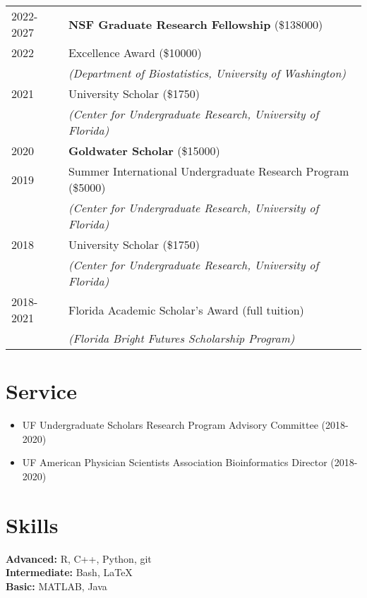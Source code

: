 \documentclass[margin,centered]{res}
\begin{document}
\begin{resume}
\begin{tabular}{@{}p{0.8in}p{4in}}
2022-2027 & \textbf{NSF Graduate Research Fellowship} (\$138000)\\
2022 & Excellence Award (\$10000)\\
&\textit{(Department of Biostatistics, University of Washington)}\\
2021 & University Scholar (\$1750)\\
&\textit{(Center for Undergraduate Research, University of Florida)}\\
2020 & \textbf{Goldwater Scholar} (\$15000)\\
2019 & Summer International Undergraduate Research Program (\$5000) \\
&\textit{(Center for Undergraduate Research, University of Florida)}\\
2018 & University Scholar (\$1750)\\
&\textit{(Center for Undergraduate Research, University of Florida)}\\
2018-2021 & Florida Academic Scholar's Award (full tuition) \\
&\textit{(Florida Bright Futures Scholarship Program)}\\
\end{tabular}

\section{\sc Service}

\begin{itemize}
\item UF Undergraduate Scholars Research Program Advisory Committee (2018-2020)
\item UF American Physician Scientists Association Bioinformatics Director (2018-2020)
\end{itemize}

\section{\sc Skills}
{\bf Advanced:} R, C++, Python, git\\
{\bf Intermediate:} Bash, LaTeX\\
{\bf Basic:} MATLAB, Java




\end{resume}
\end{document}
